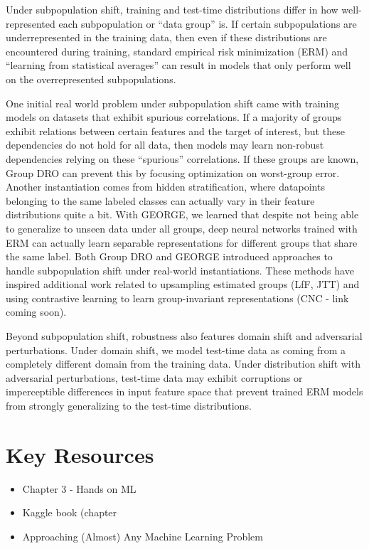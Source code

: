 \documentclass[openany]{book}
\begin{document}
Under subpopulation shift, training and test-time distributions differ in how well-represented each subpopulation or “data group” is. If certain subpopulations are underrepresented in the training data, then even if these distributions are encountered during training, standard empirical risk minimization (ERM) and “learning from statistical averages” can result in models that only perform well on the overrepresented subpopulations.

One initial real world problem under subpopulation shift came with training models on datasets that exhibit spurious correlations. If a majority of groups exhibit relations between certain features and the target of interest, but these dependencies do not hold for all data, then models may learn non-robust dependencies relying on these “spurious” correlations. If these groups are known, Group DRO can prevent this by focusing optimization on worst-group error.
Another instantiation comes from hidden stratification, where datapoints belonging to the same labeled classes can actually vary in their feature distributions quite a bit. With GEORGE, we learned that despite not being able to generalize to unseen data under all groups, deep neural networks trained with ERM can actually learn separable representations for different groups that share the same label.
Both Group DRO and GEORGE introduced approaches to handle subpopulation shift under real-world instantiations. These methods have inspired additional work related to upsampling estimated groups (LfF, JTT) and using contrastive learning to learn group-invariant representations (CNC - link coming soon).

Beyond subpopulation shift, robustness also features domain shift and adversarial perturbations. Under domain shift, we model test-time data as coming from a completely different domain from the training data. Under distribution shift with adversarial perturbations, test-time data may exhibit corruptions or imperceptible differences in input feature space that prevent trained ERM models from strongly generalizing to the test-time distributions. 


\section{Key Resources}

\begin{itemize}
    \item Chapter 3 - Hands on ML 
    \item Kaggle book (chapter 
    \item Approaching (Almost) Any Machine Learning Problem

\end{itemize}
\end{document}
